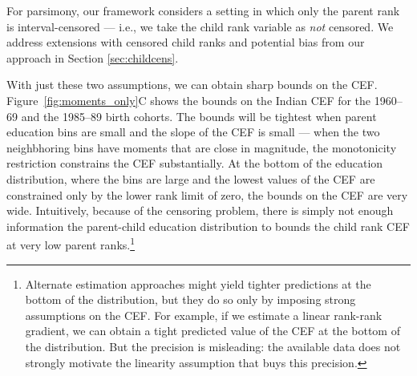 \documentclass[12pt,letterpaper]{article}
\numberwithin{equation}{section}
\begin{document}
For parsimony, our framework considers a setting in which only the parent rank is interval-censored --- i.e., we take the child rank variable as \textit{not} censored. We address extensions with censored child ranks and potential bias from our approach in Section \ref{sec:childcens}.

With just these two assumptions, we can obtain sharp bounds on the CEF. Figure~\ref{fig:moments_only}C shows the bounds on the Indian CEF for the 1960--69 and the 1985--89 birth cohorts. The bounds will be tightest when parent education bins are small and the slope of the CEF is small --- when the two neighbhoring bins have moments that are close in magnitude, the monotonicity restriction constrains the CEF substantially. At the bottom of the education distribution, where the bins are large and the lowest values of the CEF are constrained only by the lower rank limit of zero, the bounds on the CEF are very wide. Intuitively, because of the censoring problem, there is simply not enough information the parent-child education distribution to bounds the child rank CEF at very low parent ranks.\footnote{Alternate estimation approaches might yield tighter predictions at the bottom of the distribution, but they do so only by imposing strong assumptions on the CEF. For example, if we estimate a linear rank-rank gradient, we can obtain a tight predicted value of the CEF at the bottom of the distribution. But the precision is misleading: the available data does not strongly motivate the linearity assumption that buys this precision.}
\end{document}

